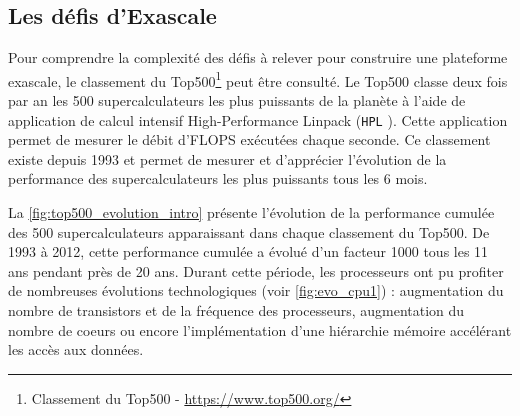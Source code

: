     \subsection{Les défis d'Exascale} 

        Pour comprendre la complexité des défis à relever pour construire une plateforme \gls{exascale}, le classement du Top500\footnote{Classement du Top500 - \url{https://www.top500.org/}} peut être consulté. Le Top500 classe deux fois par an les 500 supercalculateurs les plus puissants de la planète à l'aide de application de calcul intensif High-Performance Linpack  (\verb|HPL| \cite{Dongarra2003}). Cette application permet de mesurer le débit d'\gls{FLOPS} exécutées chaque seconde. Ce classement existe depuis 1993 et permet de mesurer et d'apprécier l'évolution de la performance des supercalculateurs les plus puissants tous les 6 mois.
        
        La \autoref{fig:top500_evolution_intro} présente l'évolution de la performance cumulée des 500 supercalculateurs apparaissant dans chaque classement du Top500. De 1993 à 2012, cette performance cumulée a évolué d'un facteur 1000 tous les 11 ans pendant près de 20 ans. Durant cette période, les processeurs ont pu profiter de nombreuses évolutions technologiques (voir \autoref{fig:evo_cpu1}) : augmentation du nombre de transistors et de la fréquence des processeurs, augmentation du nombre de coeurs ou encore l'implémentation d'une hiérarchie mémoire accélérant les accès aux données.
        
